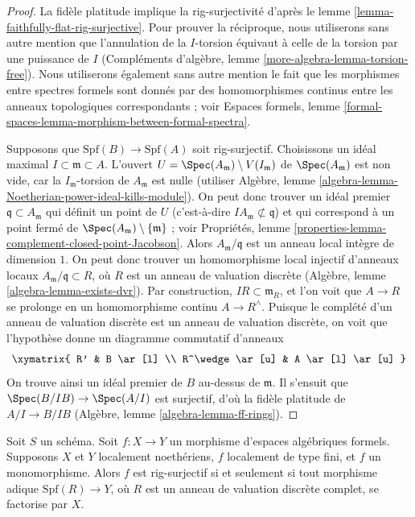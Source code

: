 \begin{proof}
La fidèle platitude implique la rig-surjectivité d'après le
lemme \ref{lemma-faithfully-flat-rig-surjective}.
Pour prouver la réciproque, nous utiliserons sans autre mention que
l'annulation de la $I$-torsion équivaut à celle de la torsion par une puissance de $I$
(Compléments d'algèbre, lemme \ref{more-algebra-lemma-torsion-free}).
Nous utiliserons également sans autre mention le fait que les morphismes entre
spectres formels sont donnés par des homomorphismes continus entre les anneaux
topologiques correspondants ; voir
Espaces formels, lemme \ref{formal-spaces-lemma-morphism-between-formal-spectra}.

\medskip\noindent
Supposons que $\text{Spf}(B) \to \text{Spf}(A)$ soit rig-surjectif.
Choisissons un idéal maximal $I \subset \mathfrak m \subset A$.
L'ouvert $U = \Spec(A_\mathfrak m) \setminus V(I_\mathfrak m)$
de $\Spec(A_\mathfrak m)$ est non vide, car la $I_\mathfrak m$-torsion de
$A_\mathfrak m$ est nulle
(utiliser Algèbre, lemme \ref{algebra-lemma-Noetherian-power-ideal-kills-module}).
On peut donc trouver un idéal premier $\mathfrak q \subset A_\mathfrak m$ qui définit
un point de $U$ (c'est-à-dire $IA_\mathfrak m \not \subset \mathfrak q$)
et qui correspond à un point fermé
de $\Spec(A_\mathfrak m) \setminus \{\mathfrak m\}$ ; voir
Propriétés, lemme \ref{properties-lemma-complement-closed-point-Jacobson}.
Alors $A_\mathfrak m/\mathfrak q$ est un anneau local intègre de dimension $1$.
On peut donc trouver un homomorphisme local injectif d'anneaux locaux
$A_\mathfrak m/\mathfrak q \subset R$, où $R$ est un anneau de valuation discrète
(Algèbre, lemme \ref{algebra-lemma-exists-dvr}).
Par construction, $IR \subset \mathfrak m_R$, et l'on voit que
$A \to R$ se prolonge en un homomorphisme continu $A \to R^\wedge$.
Puisque le complété d'un anneau de valuation discrète est un anneau de
valuation discrète, on voit que l'hypothèse donne un diagramme commutatif
d'anneaux
$$
\xymatrix{
R' & B \ar[l] \\
R^\wedge \ar[u] & A \ar[l] \ar[u]
}
$$
On trouve ainsi un idéal premier de $B$ au-dessus de $\mathfrak m$. Il s'ensuit
que $\Spec(B/IB) \to \Spec(A/I)$ est surjectif, d'où la fidèle platitude de
$A/I \to B/IB$
(Algèbre, lemme \ref{algebra-lemma-ff-rings}).
\end{proof}

\begin{lemma}
\label{lemma-monomorphism-rig-surjective}
Soit $S$ un schéma. Soit $f : X \to Y$ un morphisme d'espaces algébriques
formels. Supposons $X$ et $Y$ localement noethériens, $f$ localement de type
fini, et $f$ un monomorphisme. Alors $f$ est rig-surjectif si et seulement si
tout morphisme adique $\text{Spf}(R) \to Y$, où $R$ est un anneau de valuation
discrète complet, se factorise par $X$.
\end{lemma}

